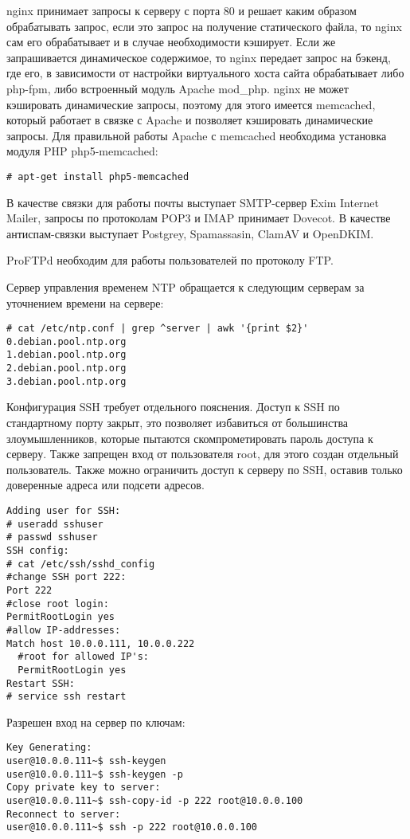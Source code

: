 nginx принимает запросы к серверу с порта 80 и решает каким образом обрабатывать запрос, если это запрос на получение статического файла, то nginx сам его обрабатывает и в случае необходимости кэширует.
Если же запрашивается динамическое содержимое, то nginx передает запрос на бэкенд, где его, в зависимости от настройки виртуального хоста сайта обрабатывает либо php-fpm, либо встроенный модуль Apache mod\_php.
nginx не может кэшировать динамические запросы, поэтому для этого имеется memcached, который работает в связке с Apache и позволяет кэшировать динамические запросы.
Для правильной работы Apache с memcached необходима установка модуля PHP php5-memcached:
\begin{lstlisting}
# apt-get install php5-memcached
\end{lstlisting}

В качестве связки для работы почты выступает SMTP-сервер Exim Internet Mailer, запросы по протоколам POP3 и IMAP принимает Dovecot.
В качестве антиспам-связки выступает Postgrey, Spamassasin, ClamAV и OpenDKIM.

ProFTPd необходим для работы пользователей по протоколу FTP.

Сервер управления временем NTP обращается к следующим серверам за уточнением времени на сервере:
\begin{lstlisting}
# cat /etc/ntp.conf | grep ^server | awk '{print $2}'
0.debian.pool.ntp.org
1.debian.pool.ntp.org
2.debian.pool.ntp.org
3.debian.pool.ntp.org
\end{lstlisting}

Конфигурация SSH требует отдельного пояснения.
Доступ к SSH по стандартному порту закрыт, это позволяет избавиться от большинства злоумышленников, которые пытаются скомпрометировать пароль доступа к серверу.
Также запрещен вход от пользователя root, для этого создан отдельный пользователь.
Также можно ограничить доступ к серверу по SSH, оставив только доверенные адреса или подсети адресов.
\begin{lstlisting}
Adding user for SSH:
# useradd sshuser
# passwd sshuser
SSH config:
# cat /etc/ssh/sshd_config
#change SSH port 222:
Port 222
#close root login:
PermitRootLogin yes
#allow IP-addresses:
Match host 10.0.0.111, 10.0.0.222
  #root for allowed IP's:
  PermitRootLogin yes
Restart SSH:
# service ssh restart
\end{lstlisting}

Разрешен вход на сервер по ключам:
\begin{lstlisting}
Key Generating:
user@10.0.0.111~$ ssh-keygen
user@10.0.0.111~$ ssh-keygen -p
Copy private key to server:
user@10.0.0.111~$ ssh-copy-id -p 222 root@10.0.0.100
Reconnect to server:
user@10.0.0.111~$ ssh -p 222 root@10.0.0.100
\end{lstlisting}

